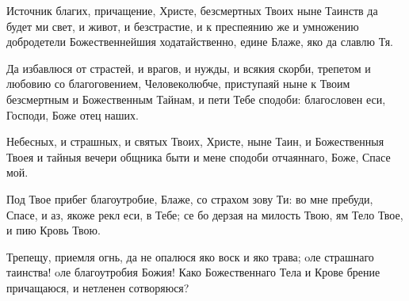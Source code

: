 \begin{mymulticols}

Источник благих, причащение, Христе, безсмертных Твоих ныне Таинств да будет ми свет, и живот, и безстрастие, и к преспеянию же и умножению добродетели Божественнейшия ходатайственно, едине Блаже, яко да славлю Тя.


Да избавлюся от страстей, и врагов, и нужды, и всякия скорби, трепетом и любовию со благоговением, Человеколюбче, приступаяй ныне к Твоим безсмертным и Божественным Тайнам, и пети Тебе сподоби: благословен еси, Господи, Боже отец наших.






Небесных, и страшных, и святых Твоих, Христе, ныне Таин, и Божественныя Твоея и тайныя вечери общника быти и мене сподоби отчаяннаго, Боже, Спасе мой.


Под Твое прибег благоутробие, Блаже, со страхом зову Ти: во мне пребуди, Спасе, и аз, якоже рекл еси, в Тебе; се бо дерзая на милость Твою, ям Тело Твое, и пию Кровь Твою.


 Трепещу, приемля огнь, да не опалюся яко воск и яко трава; oле страшнаго таинства! oле благоутробия Божия! Како Божественнаго Тела и Крове брение причащаюся, и нетленен сотворяюся?





\end{mymulticols}

